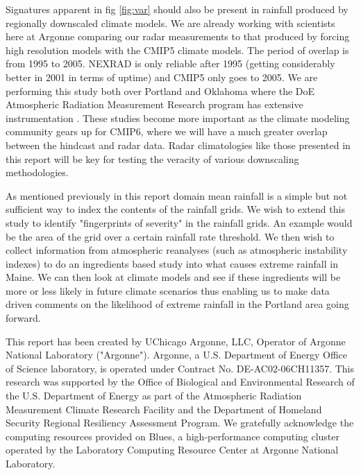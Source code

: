 \documentclass[twocol]{ametsoc}
\begin{document}
Signatures apparent in fig \ref{fig:var} should also be present in rainfall produced by regionally downscaled climate models. We are already 
working with scientists here at Argonne comparing our radar measurements to that produced by forcing high resolution models with the 
CMIP5 climate models. The period of overlap is from 1995 to 2005. NEXRAD is only reliable after 1995 (getting considerably better in 2001 in 
terms of uptime) and CMIP5 only goes to 2005. We are performing this study both over Portland and Oklahoma where the DoE Atmospheric 
Radiation Measurement Research program has extensive instrumentation \cite{ackerman_atmospheric_2003}. These studies become more 
important as the climate modeling community gears up for CMIP6, where we will have a much greater overlap between the hindcast and radar
 data. Radar climatologies like those presented in this report will be key for testing the veracity of various downscaling methodologies. 
 
As mentioned previously in this report domain mean rainfall is a simple but not sufficient way to index the contents of the rainfall grids. We wish 
to extend this study to identify "fingerprints of severity" in the rainfall grids. An example would be the area of the grid over a certain rainfall rate 
threshold. We then wish to collect information from atmospheric reanalyses (such as atmospheric instability indexes) to do an ingredients based 
study into what causes extreme rainfall in Maine. We can then look at climate models and see if these ingredients will be more or less likely in 
future climate scenarios thus enabling us to make data driven comments on the likelihood of extreme rainfall in the Portland area going forward. 


\acknowledgments{}
This report has been created by UChicago Argonne, LLC, Operator of Argonne National Laboratory ("Argonne"). 
Argonne, a U.S. Department of Energy Office of Science laboratory, is operated under Contract No. DE-AC02-06CH11357. 
This research was supported by the Office of Biological and Environmental Research of the U.S. Department of Energy as
 part of the Atmospheric Radiation Measurement Climate Research Facility and the Department of Homeland Security
 Regional Resiliency Assessment Program. We gratefully acknowledge the computing resources provided on Blues,
 a high-performance computing cluster operated by the Laboratory Computing Resource Center at Argonne National Laboratory.
 
\end{document}
